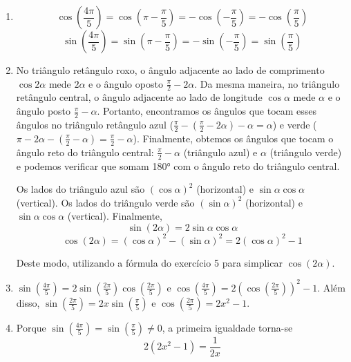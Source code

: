 \begin{enumerate}
\item
  $$\cos\left(\frac{4\pi}{5}\right) = \cos\left(\pi-\frac{\pi}{5}\right) =
  -\cos\left(-\frac{\pi}{5}\right) = -\cos\left(\frac{\pi}{5}\right)$$
  $$\sin\left(\frac{4\pi}{5}\right) = \sin\left(\pi-\frac{\pi}{5}\right) =
  -\sin\left(-\frac{\pi}{5}\right) = \sin\left(\frac{\pi}{5}\right)$$

\item No triângulo retângulo roxo, o ângulo adjacente ao lado de comprimento
  $\cos 2\alpha$ mede $2\alpha$ e o ângulo oposto $\frac{\pi}{2} - 2\alpha$.
  Da mesma maneira, no triângulo retângulo central, o ângulo adjacente
  ao lado de longitude $\cos \alpha$ mede $\alpha$ e o ângulo posto
  $\frac{\pi}{2} - \alpha$. Portanto, encontramos os ângulos que tocam
  esses ângulos no triângulo retângulo azul ($\frac{\pi}{2} -
  \left(\frac{\pi}{2} - 2\alpha\right) - \alpha =
  \alpha$) e verde ($\pi - 2\alpha - \left(\frac{\pi}{2}-\alpha\right) =
  \frac{\pi}{2} - \alpha$).
  Finalmente, obtemos os ângulos que tocam o ângulo reto do triângulo central:
  $\frac{\pi}{2} - \alpha$ (triângulo azul) e $\alpha$
  (triângulo verde) e podemos verificar que somam 180° com o ângulo reto
  do triângulo central.

  Os lados do triângulo azul são $\left(\cos \alpha\right)^2$ (horizontal) e
  ${\sin \alpha} {\cos \alpha}$ (vertical). 
  Os lados do triângulo verde são $\left(\sin \alpha\right)^2$ (horizontal) e
  ${\sin \alpha} {\cos \alpha}$ (vertical). Finalmente,
  $${\sin \left(2\alpha\right)} = 2 {\sin \alpha} {\cos \alpha}$$
  $${\cos \left(2\alpha\right)} = \left(\cos \alpha\right)^2 - 
  \left(\sin \alpha\right)^2 = 
  2\left(\cos \alpha\right)^2 - 1$$
  
  Deste modo, utilizando a fórmula do exercício 5 para simplicar
  $\cos \left(2\alpha\right)$.

\item 

${\sin \left(\frac{4\pi}{5}\right)} = 2 {\sin \left(\frac{2\pi}{5}\right)}
{\cos \left(\frac{2\pi}{5}\right)}$ e
${\cos \left(\frac{4\pi}{5}\right)} =
2 \left({\cos \left(\frac{2\pi}{5}\right)}\right)^2 - 1$. Além disso,
${\sin \left(\frac{2\pi}{5}\right)} = 2 x {\sin \left(\frac{\pi}{5}\right)}$ e
${\cos \left(\frac{2\pi}{5}\right)} = 2x^2 - 1$.

\item Porque
$\sin\left(\frac{4\pi}{5}\right) = \sin\left(\frac{\pi}{5}\right) \neq 0$,
a primeira igualdade torna-se
$$2 \left(2x^2-1\right) = \frac{1}{2x}$$


\end{enumerate}
